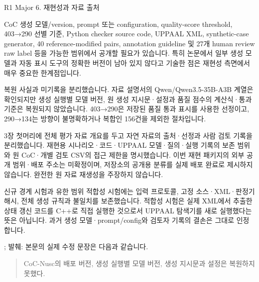 \clearpage

\begin{reviewitem}{R1 Major 6. 재현성과 자료 출처}

\begin{reviewercomment}

CoC 생성 모델/version, prompt 또는 configuration, quality-score threshold, 403→290 선별 기준, Python checker source code, UPPAAL XML, synthetic-case generator, 40 reference-modified pairs, annotation guideline 및 27개 human review raw label 등을 가능한 범위에서 공개할 필요가 있습니다. 특히 논문에서 일부 생성 모델과 자동 표시 도구의 정확한 버전이 남아 있지 않다고 기술한 점은 재현성 측면에서 매우 중요한 한계점입니다.

\end{reviewercomment}

\begin{authorresponse}

복원 사실과 미기록을 분리했습니다. 자료 설명서의 Qwen/Qwen3.5-35B-A3B 계열은 확인되지만 생성 실행별 모델 버전, 원 생성 지시문·설정과 품질 점수의 계산식·통과 기준은 복원되지 않았습니다. 403→290은 저장된 품질 통과 표시를 사용한 선정이고, 290→134는 방향이 불명확하거나 복합인 156건을 제외한 절차입니다.

3장 첫머리에 전체 평가 자료 개요를 두고 자연 자료의 출처·선정과 사람 검토 기록을 분리했습니다. 재현용 시나리오·코드·UPPAAL 모델·질의·실행 기록의 보존 범위와 원 CoC·개별 검토 CSV의 접근 제한을 명시했습니다. 이번 재현 패키지의 외부 공개 범위·배포 주소는 미확정이며, 저장소의 공개용 분류를 실제 배포 완료로 제시하지 않습니다. 완전한 원 자료 재생성을 주장하지 않습니다.

신규 경계 시험과 유한 범위 적합성 시험에는 입력 프로토콜, 고정 소스·XML·판정기 해시, 전체 생성 규칙과 불일치를 보존했습니다. 적합성 시험은 실제 XML에서 추출한 상태 갱신 코드를 C++로 직접 실행한 것으로서 UPPAAL 탐색기를 새로 실행했다는 뜻은 아닙니다. 과거 생성 모델·prompt/config와 검토자 기록의 결손은 그대로 인정합니다.

\end{authorresponse}

\begin{manuscriptrevision}{; 발췌: }
본문의 실제 수정 문장은 다음과 같습니다.

\begin{quote}
CoC-Nusc의 배포 버전, 생성 실행별 모델 버전, 생성 지시문과 설정은 복원하지 못했다.
\end{quote}
\end{manuscriptrevision}

\end{reviewitem}

